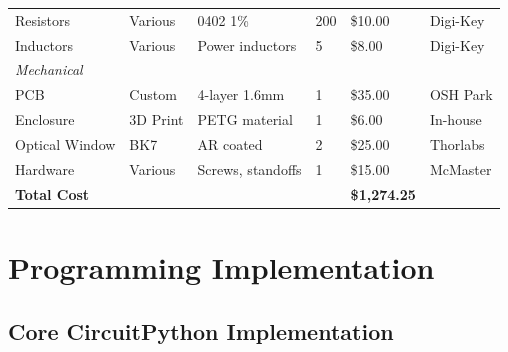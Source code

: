 \documentclass[12pt,a4paper]{article}
\begin{document}
\begin{table}[H]
\begin{tabular}{llllll}
Resistors & Various & 0402 1\% & 200 & \$10.00 & Digi-Key \\
Inductors & Various & Power inductors & 5 & \$8.00 & Digi-Key \\
\midrule
\multicolumn{6}{l}{\textit{Mechanical}} \\
PCB & Custom & 4-layer 1.6mm & 1 & \$35.00 & OSH Park \\
Enclosure & 3D Print & PETG material & 1 & \$6.00 & In-house \\
Optical Window & BK7 & AR coated & 2 & \$25.00 & Thorlabs \\
Hardware & Various & Screws, standoffs & 1 & \$15.00 & McMaster \\
\bottomrule
\multicolumn{4}{l}{\textbf{Total Cost}} & \textbf{\$1,274.25} & \\
\bottomrule
\end{tabular}
\end{table}

\section{Programming Implementation}

\subsection{Core CircuitPython Implementation}
\end{document}
